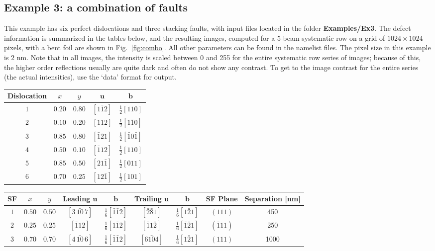 \documentclass[11pt]{article}
\begin{document}
\newpage
\subsection{Example 3: a combination of faults}
This example has six perfect dislocations and three stacking faults, with input files located in the folder \textbf{Examples/Ex3}.  
The defect information is summarized in the tables below, and the resulting images, computed for a $5$-beam systematic row on a 
grid of $1024\times 1024$ pixels, with a bent foil are shown in Fig.~\ref{fig:combo}.  All other parameters can be found in the namelist files.
The pixel size in this example is $2$ nm.  Note that in all images, the intensity is scaled between 0 and 255 for the entire systematic row
series of images; because of this, the higher order reflections usually are quite dark and often do not show any contrast.  To get to the
image contrast for the entire series (the actual intensities), use the `data' format for output.

\begin{table}[hb]
\centering\leavevmode
\begin{tabular}{|c|cc|cc|}
\hline
Dislocation & $x$ & $y$ & $\mathbf{u}$ & $\mathbf{b}$ \\
\hline\hline
$1$ & $0.20$ & $0.80$ & $[1\bar{1}2]$ & $\frac{1}{2}[110]$\\
$2$ & $0.10$ & $0.20$ & $[112]$ & $\frac{1}{2}[1\bar{1}0]$\\
$3$ & $0.85$ & $0.80$ & $[\bar{1}21]$ & $\frac{1}{2}[\bar{1}0\bar{1}]$\\
$4$ & $0.50$ & $0.10$ & $[\bar{1}12]$ & $\frac{1}{2}[110]$\\
$5$ & $0.85$ & $0.50$ & $[21\bar{1}]$ & $\frac{1}{2}[011]$\\
$6$ & $0.70$ & $0.25$ & $[12\bar{1}]$ & $\frac{1}{2}[101]$\\ 
\hline
\end{tabular}
\begin{tabular}{|c|cc|cc|cc|cc|}
\hline
SF& $x$ & $y$ & Leading $\mathbf{u}$ & $\mathbf{b}$ & Trailing $\mathbf{u}$ & $\mathbf{b}$ & SF Plane & Separation [nm]\\
\hline\hline
$1$ & $0.50$ & $0.50$ &   $[3\,\bar{10}\,7]$ & $\frac{1}{6}[\bar{1}\bar{1}2]$ & $[\bar{2}\bar{8}1]$ & $\frac{1}{6}[1\bar{2}1]$ & $(111)$ & 450 \\
$2$ & $0.25$ & $0.25$ &   $[\bar{1}12]$ & $\frac{1}{6}[1\bar{1}2]$ & $[\bar{1}1\bar{2}]$ & $\frac{1}{6}[\bar{1}\bar{2}1]$ & $(\bar{1}11)$ & 250 \\
$3$ & $0.70$ & $0.70$ &   $[4\,\bar{10}\,6]$ & $\frac{1}{6}[\bar{1}\bar{1}2]$ & $[6\bar{10}4]$ & $\frac{1}{6}[1\bar{2}1]$ & $(111)$ & 1000 \\
\hline
\end{tabular}
\end{table}
\end{document}
